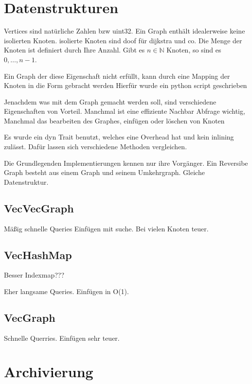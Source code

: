 \section{Datenstrukturen}

Vertices sind natürliche Zahlen bzw uint32.
Ein Graph enthält idealerweise keine isolierten Knoten.
isolierte Knoten sind doof für dijkstra und co.
Die Menge der Knoten ist definiert durch Ihre Anzahl.
Gibt es $n \in \mathbb{N}$ Knoten, so sind es $0, \dotsc, n - 1$.

Ein Graph der diese Eigenschaft nicht erfüllt, kann durch eine Mapping der Knoten in die Form gebracht werden
Hierfür wurde ein python script geschrieben

Jenachdem was mit dem Graph gemacht werden soll, sind verschiedene Eigenschaften von Vorteil.
Manchmal ist eine effiziente Nachbar Abfrage wichtig,
Manchmal das bearbeiten des Graphes, einfügen oder löschen von Knoten

Es wurde ein dyn Trait benutzt, welches eine Overhead hat und kein inlining zulässt.
Dafür lassen sich verschiedene Methoden vergleichen.

Die Grundlegenden Implementierungen kennen nur ihre Vorgänger.
Ein Reversibe Graph besteht aus einem Graph und seinem Umkehrgraph.
Gleiche Datenstruktur.

\subsection{VecVecGraph}
Mäßig schnelle Queries
Einfügen mit suche.
Bei vielen Knoten teuer.

\subsection{VecHashMap}
Besser Indexmap???

Eher langsame Queries.
Einfügen in O(1).

\subsection{VecGraph}
Schnelle Querries.
Einfügen sehr teuer.


\section{Archivierung}

